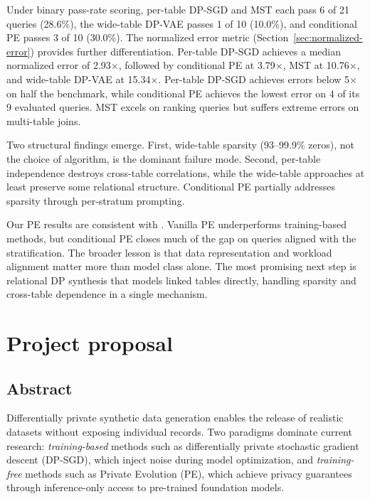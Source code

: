 \documentclass[12pt,letterpaper]{article}
\renewcommand{\_}{\textunderscore\allowbreak}
\begin{document}
Under binary pass-rate scoring, per-table DP-SGD and MST each pass 6 of 21 queries (28.6\%), the wide-table DP-VAE passes 1 of 10 (10.0\%), and conditional PE passes 3 of 10 (30.0\%). The normalized error metric (Section~\ref{sec:normalized-error}) provides further differentiation. Per-table DP-SGD achieves a median normalized error of 2.93$\times$, followed by conditional PE at 3.79$\times$, MST at 10.76$\times$, and wide-table DP-VAE at 15.34$\times$. Per-table DP-SGD achieves errors below 5$\times$ on half the benchmark, while conditional PE achieves the lowest error on 4 of its 9 evaluated queries. MST excels on ranking queries but suffers extreme errors on multi-table joins.

Two structural findings emerge. First, wide-table sparsity (93--99.9\% zeros), not the choice of algorithm, is the dominant failure mode. Second, per-table independence destroys cross-table correlations, while the wide-table approaches at least preserve some relational structure. Conditional PE partially addresses sparsity through per-stratum prompting.

Our PE results are consistent with \citet{swanberg2025apiaccessllmsuseful}. Vanilla PE underperforms training-based methods, but conditional PE closes much of the gap on queries aligned with the stratification. The broader lesson is that data representation and workload alignment matter more than model class alone. The most promising next step is relational DP synthesis that models linked tables directly, handling sparsity and cross-table dependence in a single mechanism.

\newpage

\makereference

\nocite{*}



\newpage
\appendix

\section{Project proposal}

\subsection{Abstract}

Differentially private synthetic data generation enables the release of realistic datasets without exposing individual records. Two paradigms dominate current research: \textit{training-based} methods such as differentially private stochastic gradient descent (DP-SGD), which inject noise during model optimization, and \textit{training-free} methods such as Private Evolution (PE), which achieve privacy guarantees through inference-only access to pre-trained foundation models.
\end{document}
